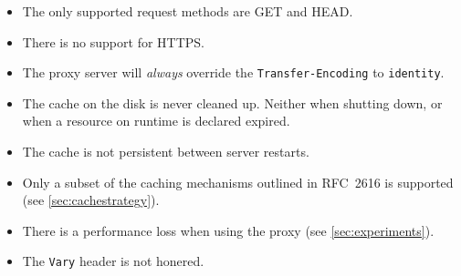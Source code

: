 \documentclass{sig-alternate}
\begin{document}
\begin{itemize}
    \item The only supported request methods are GET and HEAD.
    \item There is no support for HTTPS.
    \item The proxy server will \emph{always} override the \verb+Transfer-Encoding+ to \verb+identity+.
    \item The cache on the disk is never cleaned up. Neither when shutting down, or when a resource on runtime is declared expired.
    \item The cache is not persistent between server restarts.
    \item Only a subset of the caching mechanisms outlined in RFC~2616 is supported (see \autoref{sec:cachestrategy}).
    \item There is a performance loss when using the proxy (see \autoref{sec:experiments}).
    \item The \verb+Vary+ header is not honered.
\end{itemize}

%

\end{document}

